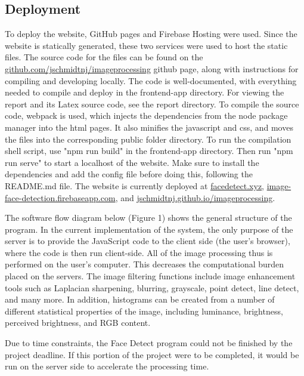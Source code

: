 \documentclass{article}
\let\Oldsubsection\subsection
\renewcommand{\subsection}{\FloatBarrier\Oldsubsection}
\begin{document}
  \subsection{Deployment}

  To deploy the website, GitHub pages and Firebase Hosting were used. Since the website is statically generated, these two services were used to host the static files. The source code for the files can be found on the \href{https://github.com/jschmidtnj/imageprocessing}{github.com/jschmidtnj/imageprocessing} github page, along with instructions for compiling and developing locally. The code is well-documented, with everything needed to compile and deploy in the frontend-app directory. For viewing the report and its Latex source code, see the report directory. To compile the source code, webpack is used, which injects the dependencies from the node package manager into the html pages. It also minifies the javascript and css, and moves the files into the corresponding public folder directory. To run the compilation shell script, use "npm run build" in the frontend-app directory. Then run "npm run serve" to start a localhost of the website. Make sure to install the dependencies and add the config file before doing this, following the README.md file. The website is currently deployed at \href{https://facedetect.xyz/}{facedetect.xyz}, \href{https://image-face-detection.firebaseapp.com/}{image-face-detection.firebaseapp.com}, and \href{https://jschmidtnj.github.io/ImageProcessing/}{jschmidtnj.github.io/imageprocessing}.
  
   The software flow diagram below (Figure 1) shows the general structure of the program. In the current implementation of the system, the only purpose of the server is to provide the JavaScript code to the client side (the user's browser), where the code is then run client-side. All of the image processing thus is performed on the user's computer. This decreases the computational burden placed on the servers. The image filtering functions include image enhancement tools such as Laplacian sharpening, blurring, grayscale, point detect, line detect, and many more. In addition, histograms can be created from a number of different statistical properties of the image, including luminance, brightness, perceived brightness, and RGB content.
  
  Due to time constraints, the Face Detect program could not be finished by the project deadline. If this portion of the project were to be completed, it would be run on the server side to accelerate the processing time.
\end{document}
